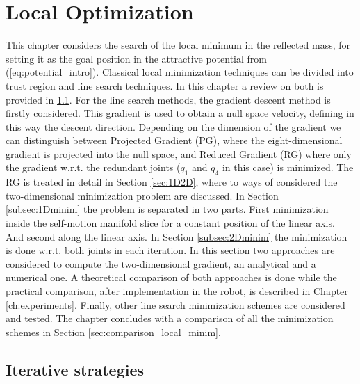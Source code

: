 \chapter{Local Optimization}
\label{ch:localoptimization}



This chapter considers the search of the 
local minimum in the reflected mass, for setting it as the goal position in the attractive potential from (\ref{eq:potential_intro}). Classical local minimization techniques can be divided  into trust region and line search   techniques. In this chapter a review on both is provided in \ref{sec:iterative_strategies}. For the line search methods, the gradient descent method is firstly considered. This gradient is used to obtain a null space velocity,  defining in this way the descent direction. Depending on the dimension of the gradient we can distinguish between Projected Gradient (PG), where the eight-dimensional gradient is projected into the null space, and Reduced Gradient (RG) where only the gradient w.r.t. the redundant joints ($q_1$ and $q_4$ in this case) is minimized. The RG is treated in detail in Section \ref{sec:1D2D}, where to ways of considered the two-dimensional minimization problem are discussed. In Section \ref{subsec:1Dminim} the problem is separated in two parts. First minimization inside the self-motion manifold slice for a constant position of the linear axis. And second along the linear axis. In Section \ref{subsec:2Dminim} the minimization is done w.r.t. both joints in each iteration. In this section two approaches are considered to compute the two-dimensional gradient, an analytical and a numerical one.
A theoretical comparison of both approaches is done while the practical comparison, after implementation in the robot, is described in  Chapter \ref{ch:experiments}.
Finally, other line search minimization schemes are considered and tested. The chapter concludes with a comparison of all the minimization schemes in  Section \ref{sec:comparison_local_minim}.






\section{Iterative strategies}
\label{sec:iterative_strategies}


